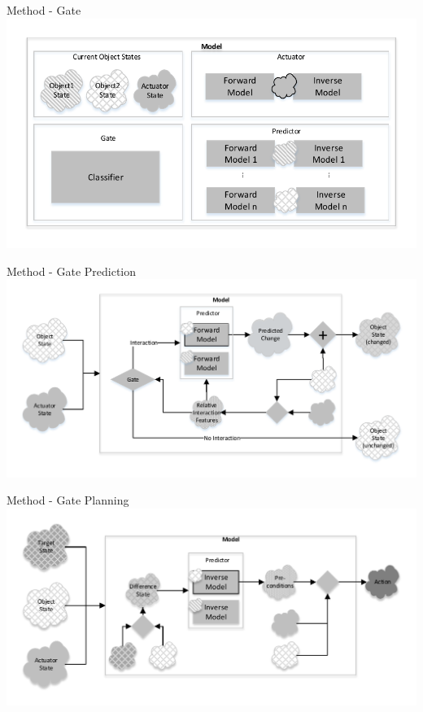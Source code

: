 \documentclass{beamer}
\begin{document}
\begin{frame}{Method - Gate}
\includegraphics[width=\textwidth]{GateOverview.pdf}
\end{frame}

\begin{frame}{Method - Gate Prediction}
\includegraphics[width=\textwidth]{GatePrediction.pdf}
\end{frame}

\begin{frame}{Method - Gate Planning}
\includegraphics[width=\textwidth]{GatePlanning.pdf}
\end{frame}
\end{document}
